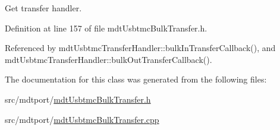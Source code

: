 Get transfer handler. 



Definition at line 157 of file mdt\-Usbtmc\-Bulk\-Transfer.\-h.



Referenced by mdt\-Usbtmc\-Transfer\-Handler\-::bulk\-In\-Transfer\-Callback(), and mdt\-Usbtmc\-Transfer\-Handler\-::bulk\-Out\-Transfer\-Callback().



The documentation for this class was generated from the following files\-:\begin{DoxyCompactItemize}
\item 
src/mdtport/\hyperlink{mdt_usbtmc_bulk_transfer_8h}{mdt\-Usbtmc\-Bulk\-Transfer.\-h}\item 
src/mdtport/\hyperlink{mdt_usbtmc_bulk_transfer_8cpp}{mdt\-Usbtmc\-Bulk\-Transfer.\-cpp}\end{DoxyCompactItemize}
